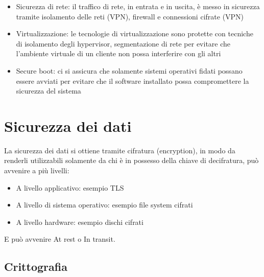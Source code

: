 \documentclass[
]{article}
\providecommand{\tightlist}{%
  \setlength{\itemsep}{0pt}\setlength{\parskip}{0pt}}
\begin{document}
{}

\begin{itemize}
\tightlist
\item
  {Sicurezza di rete}{: il traffico di rete, in entrata e in uscita, è
  messo in sicurezza tramite isolamento delle reti (VPN), firewall e
  connessioni cifrate (VPN)}
\end{itemize}

{}

\begin{itemize}
\tightlist
\item
  {Virtualizzazione}{: le tecnologie di virtualizzazione sono protette
  con tecniche di isolamento degli hypervisor, segmentazione di rete per
  evitare che l'ambiente virtuale di un cliente non possa interferire
  con gli altri }
\end{itemize}

{}

\begin{itemize}
\tightlist
\item
  {Secure boot}{: ci si assicura che solamente sistemi operativi fidati
  possano essere avviati per evitare che il software installato possa
  compromettere la sicurezza del sistema}
\end{itemize}

{}

\section{\texorpdfstring{{Sicurezza dei
dati}}{Sicurezza dei dati}}\label{h.ncyzrl4xk77x}

{La sicurezza dei dati si ottiene tramite cifratura (encryption), in
modo da renderli utilizzabili solamente da chi è in possesso della
chiave di decifratura, può avvenire a più livelli:}

\begin{itemize}
\tightlist
\item
  {A livello applicativo: esempio TLS }
\item
  {A livello di sistema operativo: esempio file system cifrati }
\item
  {A livello hardware: esempio dischi cifrati}
\end{itemize}

{}

{E può avvenire At rest o In transit.}

{}

\subsection{\texorpdfstring{{Crittografia}}{Crittografia}}\label{h.bu3abpqaasxh}
\end{document}
